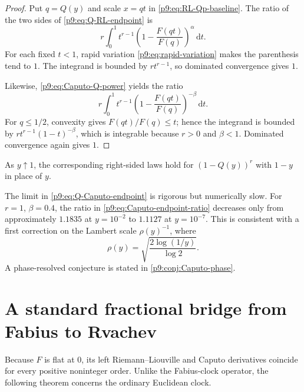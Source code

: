 \documentclass[11pt,oneside]{article}
\theoremstyle{definition}
\theoremstyle{remark}
\newcommand{\dd}{\,\mathrm d}
\newcommand{\1}{\mathbf 1}
\begin{document}
\begin{proof}
Put $q=Q(y)$ and scale $x=qt$ in
\cref{p9:eq:RL-Qp-baseline}.  The ratio of the two sides of
\cref{p9:eq:Q-RL-endpoint} is
\begin{equation}
 r\int_0^1t^{r-1}
 \left(1-\frac{F(qt)}{F(q)}\right)^\alpha\dd t.
 \label{p9:eq:RL-endpoint-ratio}
\end{equation}
For each fixed $t<1$, rapid variation \cref{p9:eq:rapid-variation} makes the
parenthesis tend to $1$.  The integrand is bounded by $rt^{r-1}$, so dominated
convergence gives $1$.

Likewise, \cref{p9:eq:Caputo-Q-power} yields the ratio
\begin{equation}
 r\int_0^1t^{r-1}
 \left(1-\frac{F(qt)}{F(q)}\right)^{-\beta}\dd t.
 \label{p9:eq:Caputo-endpoint-ratio}
\end{equation}
For $q\le1/2$, convexity gives $F(qt)/F(q)\le t$; hence the integrand is bounded
by $rt^{r-1}(1-t)^{-\beta}$, which is integrable because $r>0$ and
$\beta<1$.  Dominated convergence again gives $1$.
\end{proof}

\begin{corollary}
As $y\uparrow1$, the corresponding right-sided laws hold for
$(1-Q(y))^r$ with $1-y$ in place of $y$.
\end{corollary}

\begin{remark}
The limit in \cref{p9:eq:Q-Caputo-endpoint} is rigorous but numerically slow.
For $r=1$, $\beta=0.4$, the ratio in
\cref{p9:eq:Caputo-endpoint-ratio} decreases only from approximately $1.1835$ at
$y=10^{-2}$ to $1.1127$ at $y=10^{-7}$.  This is consistent with a first
correction on the Lambert scale $\rho(y)^{-1}$, where
\begin{equation}
 \rho(y)=\sqrt{\frac{2\log(1/y)}{\log2}}.
 \label{p9:eq:rho-y}
\end{equation}
A phase-resolved conjecture is stated in \cref{p9:conj:Caputo-phase}.
\end{remark}

\section{A standard fractional bridge from Fabius to Rvachev}
\label{p9:sec:F-up-bridge}

Because $F$ is flat at $0$, its left Riemann--Liouville and Caputo derivatives
coincide for every positive noninteger order.  Unlike the Fabius-clock
operator, the following theorem concerns the ordinary Euclidean clock.
\end{document}
